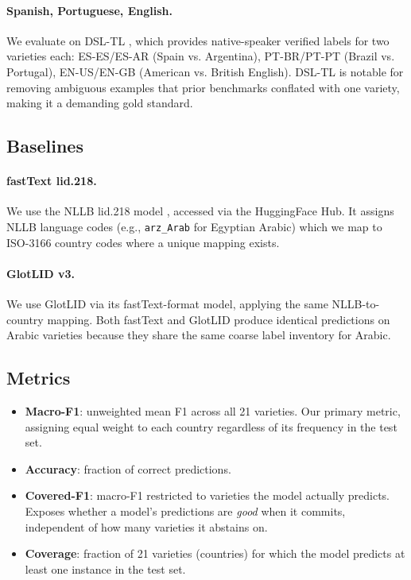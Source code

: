 \documentclass[11pt]{article}
\begin{document}
\paragraph{Spanish, Portuguese, English.} We evaluate on DSL-TL
\cite{haapanen-etal-2023-dsltl}, which provides native-speaker verified labels
for two varieties each: ES-ES/ES-AR (Spain vs. Argentina), PT-BR/PT-PT (Brazil
vs. Portugal), EN-US/EN-GB (American vs. British English).  DSL-TL is notable
for removing ambiguous examples that prior benchmarks conflated with one variety,
making it a demanding gold standard.

\subsection{Baselines}

\paragraph{fastText lid.218.}  We use the NLLB lid.218 model
\cite{joulin-etal-2017-bag,nllb-team-2022-language}, accessed via the
HuggingFace Hub. It assigns NLLB language codes
(e.g., \texttt{arz\_Arab} for Egyptian Arabic) which we map to ISO-3166 country
codes where a unique mapping exists.

\paragraph{GlotLID v3.}  We use GlotLID \cite{kargaran-etal-2023-glotlid}
via its fastText-format model, applying the same NLLB-to-country mapping.
Both fastText and GlotLID produce identical predictions on Arabic varieties
because they share the same coarse label inventory for Arabic.

\subsection{Metrics}

\begin{itemize}
\item \textbf{Macro-F1}: unweighted mean F1 across all 21 varieties. Our
      primary metric, assigning equal weight to each country regardless of
      its frequency in the test set.
\item \textbf{Accuracy}: fraction of correct predictions.
\item \textbf{Covered-F1}: macro-F1 restricted to varieties the model
      actually predicts.  Exposes whether a model's predictions are \emph{good}
      when it commits, independent of how many varieties it abstains on.
\item \textbf{Coverage}: fraction of 21 varieties (countries) for which the
      model predicts at least one instance in the test set.
\end{itemize}
\end{document}
